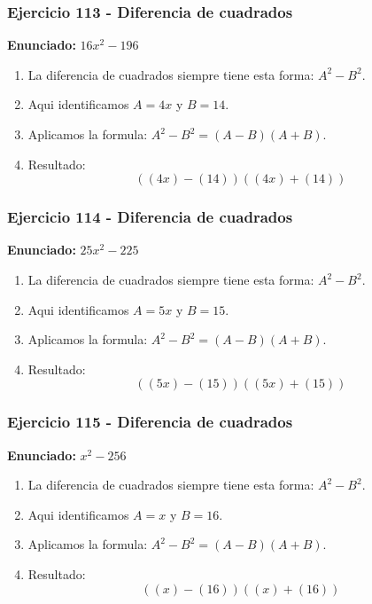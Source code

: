 \documentclass[11pt,a4paper]{article}
\begin{document}
\vspace{0.2cm}
\subsubsection*{Ejercicio 113 - Diferencia de cuadrados}
\textbf{Enunciado:} $ 16 x^{2} - 196 $\par
\begin{enumerate}[leftmargin=2em]
\item La diferencia de cuadrados siempre tiene esta forma: \(A^2-B^2\).
\item Aqui identificamos \(A=4 x\) y \(B=14\).
\item Aplicamos la formula: \(A^2-B^2=(A-B)(A+B)\).
\item Resultado: \[\boxed{\left(\left(4 x\right)-\left(14\right)\right)\left(\left(4 x\right)+\left(14\right)\right)}\]
\end{enumerate}

\vspace{0.2cm}
\subsubsection*{Ejercicio 114 - Diferencia de cuadrados}
\textbf{Enunciado:} $ 25 x^{2} - 225 $\par
\begin{enumerate}[leftmargin=2em]
\item La diferencia de cuadrados siempre tiene esta forma: \(A^2-B^2\).
\item Aqui identificamos \(A=5 x\) y \(B=15\).
\item Aplicamos la formula: \(A^2-B^2=(A-B)(A+B)\).
\item Resultado: \[\boxed{\left(\left(5 x\right)-\left(15\right)\right)\left(\left(5 x\right)+\left(15\right)\right)}\]
\end{enumerate}

\vspace{0.2cm}
\subsubsection*{Ejercicio 115 - Diferencia de cuadrados}
\textbf{Enunciado:} $ x^{2} - 256 $\par
\begin{enumerate}[leftmargin=2em]
\item La diferencia de cuadrados siempre tiene esta forma: \(A^2-B^2\).
\item Aqui identificamos \(A=x\) y \(B=16\).
\item Aplicamos la formula: \(A^2-B^2=(A-B)(A+B)\).
\item Resultado: \[\boxed{\left(\left(x\right)-\left(16\right)\right)\left(\left(x\right)+\left(16\right)\right)}\]
\end{enumerate}
\end{document}
